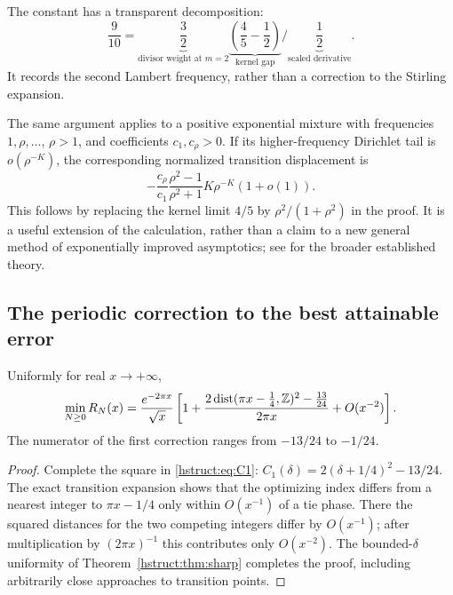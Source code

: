 The constant has a transparent decomposition:
\[
 \frac9{10}
 =\underbrace{\frac32}_{\text{divisor weight at }m=2}
  \underbrace{\left(\frac45-\frac12\right)}_{\text{kernel gap}}
  \bigg/\underbrace{\frac12}_{\text{scaled derivative}}.
\]
It records the second Lambert frequency, rather than a correction to
the Stirling expansion.

\begin{remark}
The same argument applies to a positive exponential mixture with
frequencies $1,\rho,\ldots$, $\rho>1$, and coefficients $c_1,c_\rho>0$.
If its higher-frequency Dirichlet tail is $o(\rho^{-K})$, the
corresponding normalized transition displacement is
\[
 -\frac{c_\rho}{c_1}\frac{\rho^2-1}{\rho^2+1}
                 K\rho^{-K}(1+o(1)).
\]
This follows by replacing the kernel limit $4/5$ by
$\rho^2/(1+\rho^2)$ in the proof. It is a useful extension of the
calculation, rather than a claim to a new general method of
exponentially improved asymptotics; see \cite[\S2.11]{hstruct:DLMF} for
the broader established theory.
\end{remark}

\subsection{The periodic correction to the best attainable error}

\begin{corollary}\label{hstruct:cor:lattice}
Uniformly for real $x\to+\infty$,
\begin{equation}\label{hstruct:eq:minimum-R}
 \min_{N\ge0}R_N(x)
 =\frac{e^{-2\pi x}}{\sqrt{x}}
 \left[
 1+\frac{2\operatorname{dist}(\pi x-\tfrac14,\mathbb{Z})^2-\tfrac{13}{24}}{2\pi x}
 +O(x^{-2})
 \right].
\end{equation}
The numerator of the first correction ranges from $-13/24$ to
$-1/24$.
\end{corollary}
\begin{proof}
Complete the square in \eqref{hstruct:eq:C1}:
$C_1(\delta)=2(\delta+1/4)^2-13/24$.
The exact transition expansion shows that the optimizing index
differs from a nearest integer to $\pi x-1/4$ only within
$O(x^{-1})$ of a tie phase. There the squared distances for the
two competing integers differ by $O(x^{-1})$; after multiplication
by $(2\pi x)^{-1}$ this contributes only $O(x^{-2})$.
The bounded-$\delta$ uniformity of Theorem~\ref{hstruct:thm:sharp} completes
the proof, including arbitrarily close approaches to transition points.
\end{proof}

